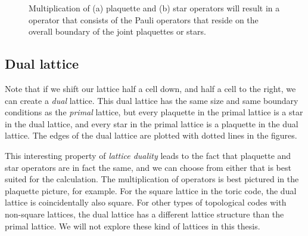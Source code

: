 \begin{figure}
  \centering
  \hspace{1cm}
  \caption{Multiplication of (a) plaquette and (b) star operators will result in a operator that consists of the Pauli operators that reside on the overall boundary of the joint plaquettes or stars. }\label{sf:fig_multistab}
\end{figure}

\subsection{Dual lattice}
Note that if we shift our lattice half a cell down, and half a cell to the right, we can create a \emph{dual} lattice. This dual lattice has the same size and same boundary conditions as the \emph{primal} lattice, but every plaquette in the primal lattice is a star in the dual lattice, and every star in the primal lattice is a plaquette in the dual lattice. The edges of the dual lattice are plotted with dotted lines in the figures.

This interesting property of \emph{lattice duality} leads to the fact that plaquette and star operators are in fact the same, and we can choose from either that is best suited for the calculation. The multiplication of operators is best pictured in the plaquette picture, for example. For the square lattice in the toric code, the dual lattice is coincidentally also square. For other types of topological codes with non-square lattices, the dual lattice has a different lattice structure than the primal lattice. We will not explore these kind of lattices in this thesis.

